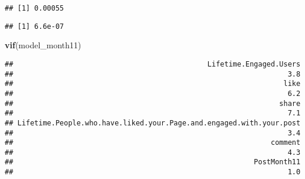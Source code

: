\documentclass[
]{article}
\newenvironment{Shaded}{\begin{snugshade}}{\end{snugshade}}
\newcommand{\DataTypeTok}[1]{\textcolor[rgb]{0.13,0.29,0.53}{#1}}
\newcommand{\DecValTok}[1]{\textcolor[rgb]{0.00,0.00,0.81}{#1}}
\newcommand{\KeywordTok}[1]{\textcolor[rgb]{0.13,0.29,0.53}{\textbf{#1}}}
\newcommand{\NormalTok}[1]{#1}
\newcommand{\OperatorTok}[1]{\textcolor[rgb]{0.81,0.36,0.00}{\textbf{#1}}}
\newcommand{\StringTok}[1]{\textcolor[rgb]{0.31,0.60,0.02}{#1}}
\begin{document}
\begin{Shaded}
\end{Shaded}

\begin{verbatim}
## [1] 0.00055
\end{verbatim}

\begin{Shaded}
\end{Shaded}

\begin{verbatim}
## [1] 6.6e-07
\end{verbatim}

\begin{Shaded}
\begin{Highlighting}[]
\KeywordTok{vif}\NormalTok{(model_month11)}
\end{Highlighting}
\end{Shaded}

\begin{verbatim}
##                                              Lifetime.Engaged.Users 
##                                                                 3.8 
##                                                                like 
##                                                                 6.2 
##                                                               share 
##                                                                 7.1 
## Lifetime.People.who.have.liked.your.Page.and.engaged.with.your.post 
##                                                                 3.4 
##                                                             comment 
##                                                                 4.3 
##                                                         PostMonth11 
##                                                                 1.0
\end{verbatim}
\end{document}
